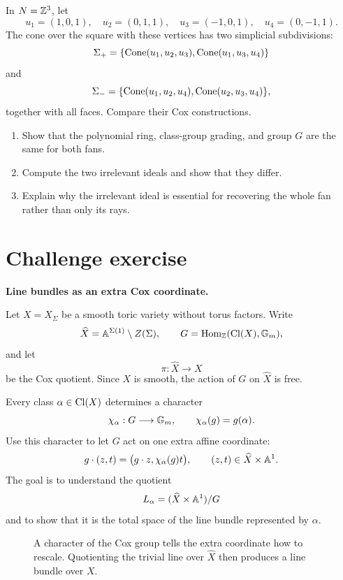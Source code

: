 \begin{exercises}
\item In \(N=\mathbb{Z}^3\), let
\[
u_1=(1,0,1),\quad
u_2=(0,1,1),\quad
u_3=(-1,0,1),\quad
u_4=(0,-1,1).
\]
The cone over the square with these vertices has two simplicial
subdivisions:
\[
\Sigma_+
=
\{\operatorname{Cone}(u_1,u_2,u_3),\operatorname{Cone}(u_1,u_3,u_4)\}
\]
and
\[
\Sigma_-
=
\{\operatorname{Cone}(u_1,u_2,u_4),\operatorname{Cone}(u_2,u_3,u_4)\},
\]
together with all faces. Compare their Cox constructions.
\begin{enumerate}[label=(\alph*),wide=0pt]
\item Show that the polynomial ring, class-group grading, and group
\(G\) are the same for both fans.
\item Compute the two irrelevant ideals and show that they differ.
\item Explain why the irrelevant ideal is essential for recovering the
whole fan rather than only its rays.
\end{enumerate}

\end{exercises}

\clearpage
\section*{Challenge exercise}

\noindent
\textbf{Line bundles as an extra Cox coordinate.}

\medskip

Let \(X=X_\Sigma\) be a smooth toric variety without torus factors.
Write
\[
\widehat X
=
\mathbb{A}^{\Sigma(1)}\setminus Z(\Sigma),
\qquad
G=\operatorname{Hom}_{\mathbb{Z}}(\operatorname{Cl}(X),\mathbb{G}_{m}),
\]
and let
\[
\pi:\widehat X\longrightarrow X
\]
be the Cox quotient. Since \(X\) is smooth, the action of \(G\) on
\(\widehat X\) is free.

Every class \(\alpha\in\operatorname{Cl}(X)\) determines a character
\[
\chi_\alpha:G\longrightarrow\mathbb{G}_{m},
\qquad
\chi_\alpha(g)=g(\alpha).
\]
Use this character to let \(G\) act on one extra affine coordinate:
\[
g\cdot(z,t)
=
\bigl(g\cdot z,\chi_\alpha(g)t\bigr),
\qquad
(z,t)\in\widehat X\times\mathbb{A}^1.
\]
The goal is to understand the quotient
\[
L_\alpha
=
(\widehat X\times\mathbb{A}^1)/G
\]
and to show that it is the total space of the line bundle represented
by \(\alpha\).

\begin{figure}[ht]
\centering
{}
\caption{A character of the Cox group tells the extra coordinate how
to rescale. Quotienting the trivial line over \(\widehat X\) then
produces a line bundle over \(X\).}
\label{fig:line-bundle-extra-cox-coordinate}
\end{figure}

